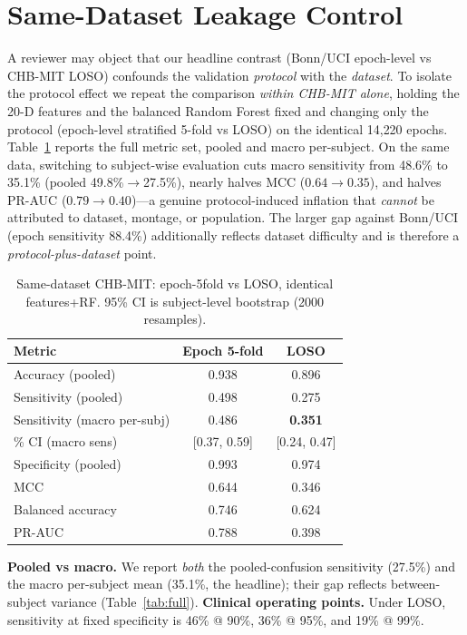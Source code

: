 \documentclass[10pt,journal,twocolumn]{IEEEtran}
\begin{document}
\section{Same-Dataset Leakage Control}\label{sec:samedataset}
A reviewer may object that our headline contrast (Bonn/UCI epoch-level vs CHB-MIT LOSO) confounds the validation \emph{protocol} with the \emph{dataset}. To isolate the protocol effect we repeat the comparison \emph{within CHB-MIT alone}, holding the 20-D features and the balanced Random Forest fixed and changing only the protocol (epoch-level stratified 5-fold vs LOSO) on the identical 14{,}220 epochs. Table~\ref{tab:samed} reports the full metric set, pooled and macro per-subject. On the same data, switching to subject-wise evaluation cuts macro sensitivity from 48.6\% to 35.1\% (pooled 49.8\%$\rightarrow$27.5\%), nearly halves MCC ($0.64\rightarrow0.35$), and halves PR-AUC ($0.79\rightarrow0.40$)---a genuine protocol-induced inflation that \emph{cannot} be attributed to dataset, montage, or population. The larger gap against Bonn/UCI (epoch sensitivity 88.4\%) additionally reflects dataset difficulty and is therefore a \emph{protocol-plus-dataset} point.
\begin{table}[h]\centering\caption{Same-dataset CHB-MIT: epoch-5fold vs LOSO, identical features+RF. 95\% CI is subject-level bootstrap (2000 resamples).}\label{tab:samed}
\begin{tabular}{lcc}\toprule
Metric & Epoch 5-fold & LOSO\\\midrule
Accuracy (pooled) & 0.938 & 0.896\\
Sensitivity (pooled) & 0.498 & 0.275\\
Sensitivity (macro per-subj) & 0.486 & \textbf{0.351}\\
\;\;95\% CI (macro sens) & [0.37, 0.59] & [0.24, 0.47]\\
Specificity (pooled) & 0.993 & 0.974\\
MCC & 0.644 & 0.346\\
Balanced accuracy & 0.746 & 0.624\\
PR-AUC & 0.788 & 0.398\\\bottomrule
\end{tabular}\end{table}
\textbf{Pooled vs macro.} We report \emph{both} the pooled-confusion sensitivity (27.5\%) and the macro per-subject mean (35.1\%, the headline); their gap reflects between-subject variance (Table~\ref{tab:full}). \textbf{Clinical operating points.} Under LOSO, sensitivity at fixed specificity is 46\% @ 90\%, 36\% @ 95\%, and 19\% @ 99\%.
\end{document}
